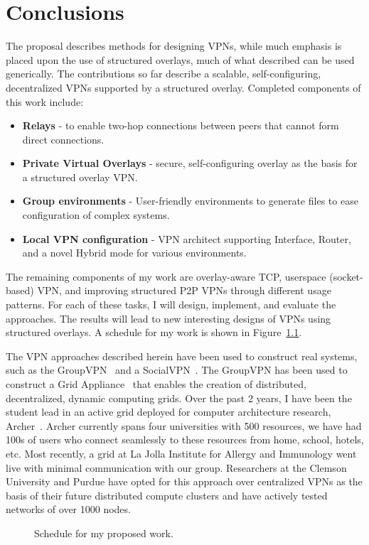 \chapter{Conclusions}
\label{conclusion}
The proposal describes methods for designing VPNs, while much emphasis is
placed upon the use of structured overlays, much of what described can be used
generically.  The contributions so far describe a scalable, self-configuring,
decentralized VPNs supported by a structured overlay.  Completed components of
this work include:
\begin{itemize}
\item \textbf{Relays} - to enable two-hop connections between peers that cannot
form direct connections.
\item \textbf{Private Virtual Overlays} - secure, self-configuring overlay as
the basis for a structured overlay VPN.
\item \textbf{Group environments} - User-friendly environments to generate
files to ease configuration of complex systems.
\item \textbf{Local VPN configuration} - VPN architect supporting Interface,
Router, and a novel Hybrid mode for various environments.
\end{itemize}

The remaining components of my work are overlay-aware TCP, userspace
(socket-based) VPN, and improving structured P2P VPNs through different usage
patterns.  For each of these tasks, I will design, implement, and evaluate the
approaches.  The results will lead to new interesting designs of VPNs using
structured overlays.  A schedule for my work is shown in Figure~\ref{fig:gantt}.

The VPN approaches described herein have been used to construct real systems,
such as the GroupVPN~\cite{gridappliance} and a SocialVPN~\cite{cops08}.  The
GroupVPN has been used to construct a Grid Appliance~\cite{grid_appliance} that
enables the creation of distributed, decentralized, dynamic computing grids.
Over the past 2 years, I have been the student lead in an active grid deployed
for computer architecture research, Archer~\cite{archer}.  Archer currently
spans four universities with 500 resources, we have had 100s of users who
connect seamlessly to these resources from home, school, hotels, etc.  Most
recently, a grid at La Jolla Institute for Allergy and Immunology went live
with minimal communication with our group.  Researchers at the Clemson
University and Purdue have opted for this approach over centralized VPNs as the
basis of their future distributed compute clusters and have actively tested
networks of over 1000 nodes.

\begin{figure}[ht]
\centering
{}
\caption{Schedule for my proposed work.}
\label{fig:gantt}
\end{figure}
